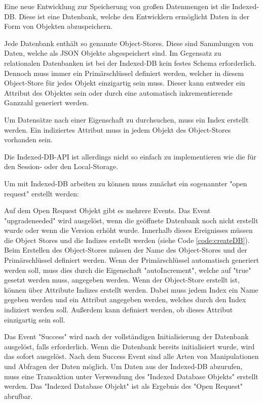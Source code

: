 
Eine neue Entwicklung zur Speicherung von großen Datenmengen ist die Indexed-DB. 
Diese ist eine Datenbank, welche den Entwicklern ermöglicht Daten in der Form von Objekten abzuspeichern.

Jede Datenbank enthält so genannte Object-Stores. Diese sind Sammlungen von Daten, welche als JSON Objekte abgespeichert sind. 
Im Gegensatz zu relationalen Datenbanken ist bei der Indexed-DB kein festes Schema erforderlich. 
Dennoch muss immer ein Primärschlüssel definiert werden, welcher in diesem Object-Store für jedes Objekt einzigartig sein muss.
Dieser kann entweder ein Attribut des Objektes sein oder durch eine automatisch inkrementierende Ganzzahl generiert werden. 

Um Datensätze nach einer Eigenschaft zu durchsuchen, muss ein Index erstellt werden. Ein indiziertes Attribut muss in jedem Objekt des Object-Stores vorhanden sein.

Die Indexed-DB-API ist allerdings nicht so einfach zu implementieren wie die für den Session- oder den Local-Storage. 

Um mit Indexed-DB arbeiten zu können muss zunächst ein sogenannter "open request" erstellt werden:


Auf dem Open Request Objekt gibt es mehrere Events. 
Das Event "upgradeneeded" wird ausgelöst, wenn die geöffnete Datenbank noch nicht erstellt wurde oder wenn die Version erhöht wurde. 
Innerhalb dieses Ereignisses müssen die Object Stores und die Indizes erstellt werden (siehe Code \ref{code:createDB}). 
Beim Erstellen des Object-Stores müssen der Name des Object-Stores und der Primärschlüssel definiert werden. Wenn der Primärschlüssel automatisch generiert werden soll, muss dies durch die Eigenschaft "autoIncrement", welche auf "true" gesetzt werden muss, angegeben werden.
Wenn der Object-Store erstellt ist, können über Attribute Indizes erstellt werden. Dabei muss jedem Index ein Name gegeben werden und ein Attribut angegeben werden, welches durch den Index indiziert werden soll. Außerdem kann definiert werden, ob dieses Attribut einzigartig sein soll.


Das Event "Success" wird nach der vollständigen Initialisierung der Datenbank ausgelöst, falls erforderlich. Wenn die Datenbank bereits initialisiert wurde, wird das sofort ausgelöst. Nach dem Success Event sind alle Arten von Manipulationen und Abfragen der Daten möglich. Um Daten aus der Indexed-DB abzurufen, muss eine Transaktion unter Verwendung des "Indexed Database Objekts" erstellt werden. Das "Indexed Database Objekt" ist als Ergebnis des "Open Request" abrufbar.

